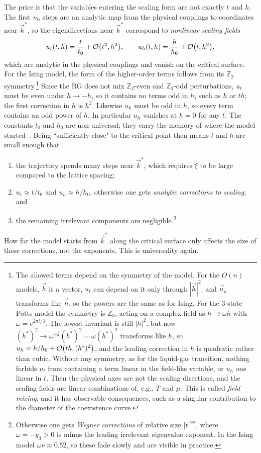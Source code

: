 The price is that the variables entering the scaling form are not exactly $t$
and $h$. The first $n_0$ steps are an analytic map from the physical couplings to
coordinates near $\vec{k}^*$, so the eigendirections near $\vec{k}^*$ correspond to
{\it nonlinear scaling fields}
\begin{equation}
  u_t(t,h)=\frac{t}{t_0}+\order{t^2,h^2},~~~~~~
  u_h(t,h)=\frac{h}{h_0}+\order{t,h^2},
\end{equation}
which are analytic in the physical couplings and vanish on the critical
surface. For the Ising model, the form of the higher-order terms follows from
its $\mathbb{Z}_2$ symmetry.\footnote{The allowed terms depend on the symmetry
of the model. For the $O(n)$ models, $\vec{h}$ is a vector, $u_t$ can depend on it
only through $|\vec{h}|^2$, and $\vec{u}_h$ transforms like $\vec{h}$, so the powers
are the same as for Ising. For the 3-state Potts model the symmetry is
$\mathbb{Z}_3$, acting on a complex field as $h\to\omega h$ with
$\omega=e^{2\pi i/3}$. The lowest invariant is still $|h|^2$, but now
$(h^*)^2\to\omega^{-2}(h^*)^2=\omega(h^*)^2$ transforms like $h$, so
$u_h=h/h_0+\order{th,(h^*)^2}$, and the leading correction in $h$ is quadratic
rather than cubic. Without any symmetry, as for the liquid-gas transition,
nothing forbids $u_t$ from containing a term linear in the field-like variable,
or $u_h$ one linear in $t$. Then the physical axes are not the scaling
directions, and the scaling fields are linear combinations of, e.g., $T$ and
$\mu$. This is called {\it field mixing}, and it has
observable consequences, such as a singular contribution to the diameter of the
coexistence curve.} Since the RG does not mix $\mathbb{Z}_2$-even and $\mathbb{Z}_2$-odd
perturbations, $u_t$ must be even under $h\to-h$, so it contains no terms
odd in $h$, such as $h$ or $th$; the first correction in $h$ is $h^2$. Likewise
$u_h$ must be odd in $h$, so every term contains an odd power of $h$. In
particular $u_h$ vanishes at $h=0$ for any $t$. The constants $t_0$ and $h_0$ are
non-universal; they carry the memory of where the model
started~\cite{cardy_scaling_1996}. Being ``sufficiently close" to the critical point
then means $t$ and $h$ are small enough that
\begin{enumerate}
\item the trajectory spends many steps near $\vec{k}^*$, which requires $\xi$ to be
large compared to the lattice spacing;
\item $u_t\approx t/t_0$ and $u_h\approx h/h_0$, otherwise one gets
{\it analytic corrections to scaling}; and
\item the remaining irrelevant components are negligible.\footnote{Otherwise one gets
{\it Wegner corrections} of relative size
$|t|^{\omega\nu}$, where $\omega=-y_3>0$ is minus the leading irrelevant
eigenvalue exponent. In the  Ising model $\omega\nu\approx0.52$, so these
fade slowly and are visible in practice.}
\end{enumerate}
How far the model starts from $\vec{k}^*$ along the critical surface only
affects the size of these corrections, not the exponents. This is
universality again.

